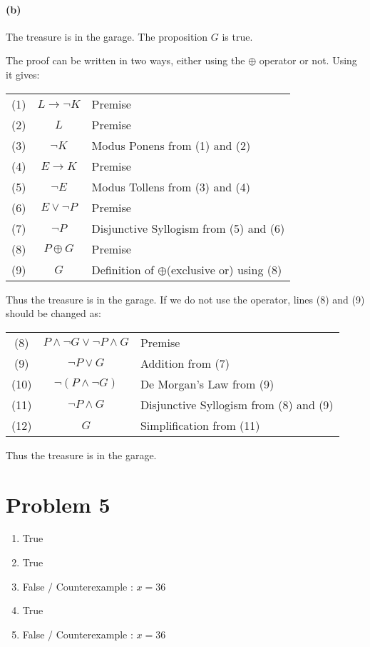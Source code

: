 \documentclass[10pt]{article}
\begin{document}
\paragraph{(b)} The treasure is in the garage. The proposition $G$ is true.

The proof can be written in two ways, either using the $\oplus$ operator or not. 
Using it gives:
\begin{table}[H]
  \hspace{0.3cm}
  \renewcommand{\arraystretch}{1.3}
  \begin{tabular}{ccl}
    (1) & $L \rightarrow \neg K$ & Premise \\
    (2) & $L$ & Premise \\
    (3) & $\neg K$ & Modus Ponens from (1) and (2) \\
    (4) & $E \rightarrow K$ & Premise \\
    (5) & $\neg E$ & Modus Tollens from (3) and (4) \\
    (6) & $E \vee \neg P$ & Premise \\
    (7) & $\neg P$ & Disjunctive Syllogism from (5) and (6) \\
    (8) & $P \oplus G$ & Premise \\
    (9) & $G$ & Definition of $\oplus$(exclusive or) using (8)
  \end{tabular}
\end{table}
Thus the treasure is in the garage. If we do not use the operator, lines (8) and (9) should be changed as:
\begin{table}[H]
  \hspace{0.3cm}
  \renewcommand{\arraystretch}{1.3}
  \begin{tabular}{ccl}
    (8) & $P \wedge \neg G \vee \neg P \wedge G$ & Premise \\
    (9) & $\neg P \vee G$ & Addition from (7) \\
    (10) & $\neg(P \wedge \neg G)$ & De Morgan's Law from (9) \\
    (11) & $\neg P \wedge G$ & Disjunctive Syllogism from (8) and (9) \\
    (12) & $G$ & Simplification from (11)
  \end{tabular}
\end{table}
Thus the treasure is in the garage.

\section*{Problem 5}
\begin{enumerate}
  \item True
  \item True
  \item False / Counterexample : $x=36$
  \item True
  \item False / Counterexample : $x=36$
\end{enumerate}
\end{document}
